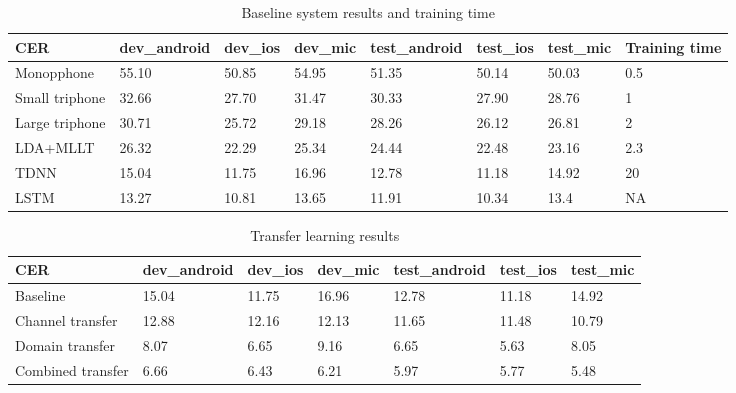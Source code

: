 \documentclass[a4paper]{article}
\begin{document}
\begin{table}[th]
  \caption{Baseline system results and training time}
  \label{tab:base}
  \centering
  \begin{tabular}{ llllllll }
    \toprule
    CER               &  dev\_android           &  dev\_ios           &  dev\_mic           & test\_android            &  test\_ios           &  test\_mic          &  Training time         \\
    \midrule
    Monopphone        &  55.10                 &  50.85             &  54.95             &  51.35                  &  50.14              &  50.03             &  0.5                   \\
    Small triphone    &  32.66                 &  27.70             &  31.47             &  30.33                  &  27.90              &  28.76             &  1                     \\
    Large triphone    &  30.71                 &  25.72             &  29.18             &  28.26                  &  26.12              &  26.81             &  2                     \\
    LDA+MLLT          &  26.32                 &  22.29             &  25.34             &  24.44                  &  22.48              &  23.16             &  2.3                   \\
    TDNN              &  15.04                 &  11.75             &  16.96             &  12.78                  &  11.18              &  14.92             &  20                    \\
    LSTM              &  13.27                 &  10.81             &  13.65             &  11.91                  &  10.34              &  13.4              &  NA                    \\
    \bottomrule
  \end{tabular}
\end{table}

\begin{table}[th]
  \caption{Transfer learning results}
  \label{tab:trans}
  \centering
  \begin{tabular}{ lllllll }
    \toprule
    CER               &  dev\_android           &  dev\_ios           &  dev\_mic           &  test\_android           &  test\_ios           &  test\_mic     \\
    \midrule
    Baseline          &  15.04                 &  11.75             &  16.96             &  12.78                  &  11.18              &  14.92        \\
    Channel transfer  &  12.88                 &  12.16             &  12.13             &  11.65                  &  11.48              &  10.79        \\
    Domain transfer   &  8.07                  &  6.65              &  9.16              &  6.65                   &  5.63               &  8.05         \\
    Combined transfer &  6.66                  &  6.43              &  6.21              &  5.97                   &  5.77               &  5.48         \\
    \bottomrule
  \end{tabular}
\end{table}
\end{document}
